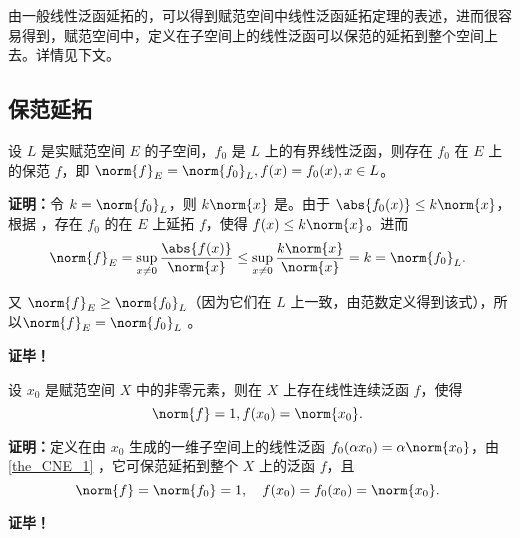 

由一般线性泛函延拓的，可以得到赋范空间中线性泛函延拓定理的表述，进而很容易得到，赋范空间中，定义在子空间上的线性泛函可以保范的延拓到整个空间上去。详情见下文。

\subsection{保范延拓}

\begin{theorem}{}\label{the_CNE_1}
设 $L$ 是实赋范空间 $E$ 的子空间，$f_0$ 是 $L$ 上的有界线性泛函，则存在 $f_0$ 在 $E$ 上的保范 $f$，即 $\norm{f}_{E}=\norm{f_0}_{L},f(x)=f_0(x),x\in L$。
\end{theorem}

\textbf{证明：}令 $k=\norm{f_0}_{L}$，则 $k\norm{x}$ 是。由于 $\abs{f_0(x)}\leq k\norm{x}$，根据 ，存在 $f_0$ 的在 $E$ 上延拓 $f$，使得 $f(x)\leq k\norm{x}$。进而
\begin{equation}
\norm{f}_E=\sup_{x\neq0}\frac{\abs{f(x)}}{\norm{x}}\leq\sup_{x\neq0}\frac{k\norm{x}}{\norm{x}}=k=\norm{f_0}_L.~
\end{equation}
 
又 $\norm{f}_E\geq \norm{f_0}_L$（因为它们在 $L$ 上一致，由范数定义得到该式），所以$\norm{f}_{E}=\norm{f_0}_{L}$ 。

\textbf{证毕！}


\begin{corollary}{}\label{cor_CNE_1}
设 $x_0$ 是赋范空间 $X$ 中的非零元素，则在 $X$ 上存在线性连续泛函 $f$，使得
\begin{equation}
\norm{f}=1,f(x_0)=\norm{x_0}.~
\end{equation}

\end{corollary}

\textbf{证明：}定义在由  $x_0$ 生成的一维子空间上的线性泛函 $f_0(\alpha x_0)=\alpha\norm{x_0}$，由\autoref{the_CNE_1} ，它可保范延拓到整个 $X$ 上的泛函 $f$，且 
\begin{equation}
\norm{f}=\norm{f_0}=1,\quad f(x_0)=f_0(x_0)=\norm{x_0}.~
\end{equation}


\textbf{证毕！}

